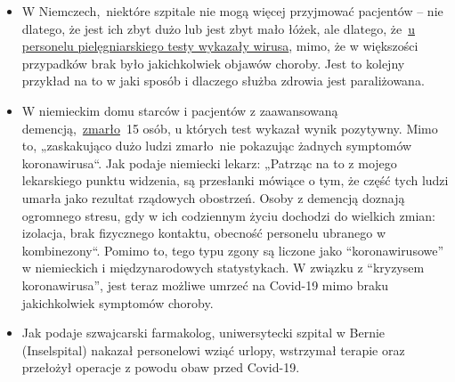 \begin{itemize}
\tightlist
\item
  W Niemczech,~niektóre szpitale nie mogą więcej przyjmować pacjentów --
  nie dlatego, że jest ich zbyt dużo lub jest zbyt mało łóżek, ale
  dlatego,
  że~\href{https://web.archive.org/web/20200330082928/https://www.sueddeutsche.de/panorama/coronavirus-news-deutschland-wolfsburg-laschet-1.4828033}{u
  personelu pielęgniarskiego testy wykazały wirusa}, mimo, że w
  większości przypadków brak było jakichkolwiek objawów choroby. Jest to
  kolejny przykład na to w jaki sposób i dlaczego służba zdrowia jest
  paraliżowana.
\item
  W niemieckim domu starców i pacjentów z zaawansowaną
  demencją,~\href{https://web.archive.org/web/20200330082928/https://www.sueddeutsche.de/panorama/coronavirus-news-deutschland-wolfsburg-laschet-1.4828033}{zmarło}~15
  osób, u których test wykazał wynik pozytywny. Mimo to, „zaskakująco
  dużo ludzi zmarło~nie pokazując żadnych symptomów koronawirusa``. Jak
  podaje niemiecki lekarz: „Patrząc na to z mojego lekarskiego punktu
  widzenia, są przesłanki mówiące o tym, że część tych ludzi umarła jako
  rezultat rządowych obostrzeń. Osoby z demencją doznają ogromnego
  stresu, gdy w ich codziennym życiu dochodzi do wielkich zmian:
  izolacja, brak fizycznego kontaktu, obecność personelu ubranego w
  kombinezony``. Pomimo to, tego typu zgony są liczone jako
  ``koronawirusowe'' w niemieckich i międzynarodowych statystykach. W
  związku z ``kryzysem koronawirusa'', jest teraz możliwe umrzeć na
  Covid-19 mimo braku jakichkolwiek symptomów choroby.
\item
  Jak podaje szwajcarski farmakolog, uniwersytecki szpital w Bernie
  (Inselspital) nakazał personelowi wziąć urlopy, wstrzymał terapie oraz
  przełożył operacje z powodu obaw przed Covid-19.
\end{itemize}

